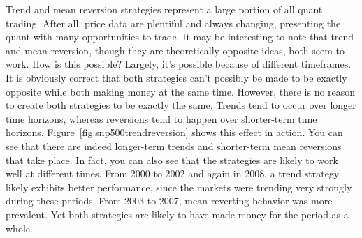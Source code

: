 \documentclass[11pt]{report}
\begin{document}
					Trend and mean reversion strategies represent a large portion of all quant trading. After all, price data are plentiful and always changing, presenting the quant with many opportunities to trade. It may be interesting to note that trend and mean reversion, though they are theoretically opposite ideas, both seem to work. How is this possible? Largely, it's possible because of different timeframes. It is obviously correct that both strategies can't possibly be made to be exactly opposite while both making money at the same time. However, there is no reason to create both strategies to be exactly the same. Trends tend to occur over longer time horizons, whereas reversions tend to happen over shorter-term time horizons. Figure~\ref{fig:snp500trendreversion} shows this effect in action. You can see that there are indeed longer-term trends and shorter-term mean reversions that take place. In fact, you can also see that the strategies are likely to work well at different times. From 2000 to 2002 and again in 2008, a trend strategy likely exhibits better performance, since the markets were trending very strongly during these periods. From 2003 to 2007, mean-reverting behavior was more prevalent. Yet both strategies are likely to have made money for the period as a whole.
\end{document}
